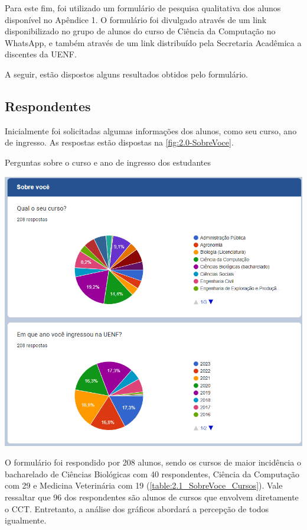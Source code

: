 Para este fim, foi utilizado um formulário de pesquisa qualitativa dos alunos disponível no Apêndice 1. O formulário foi divulgado através de um link disponibilizado no grupo de alunos do curso de Ciência da Computação no WhatsApp, e também através de um link distribuído pela Secretaria Acadêmica a discentes da UENF.

A seguir, estão dispostos alguns resultados obtidos pelo formulário.

\subsection{Respondentes} %

Inicialmente foi solicitadas algumas informações dos alunos, como seu curso, ano de ingresso. As respostas estão dispostas na \autoref{fig:2.0-SobreVoce}.

\begin{MyCenteredFigure}
  \caption{Perguntas sobre o curso e ano de ingresso dos estudantes}
  \label{fig:2.0-SobreVoce}
  \includegraphics[width=\textwidth]{files/img/2.02!3-organizacao/2.02!3.1.4-forms/2.0-SobreVoce}
\end{MyCenteredFigure} %

O formulário foi respondido por 208 alunos, sendo os cursos de maior incidência o bacharelado de Ciências Biológicas com 40 respondentes, Ciência da Computação com 29 e Medicina Veterinária com 19 (\autoref{table:2.1_SobreVoce_Cursos}). Vale ressaltar que 96 dos respondentes são alunos de cursos que envolvem diretamente o CCT. Entretanto, a análise dos gráficos abordará a percepção de todos igualmente.

